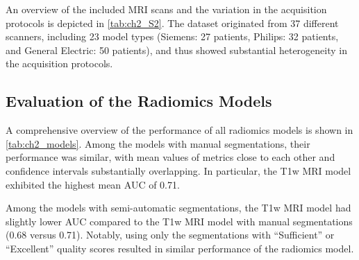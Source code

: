 An overview of the included MRI scans and the variation in the acquisition protocols is depicted in \autoref{tab:ch2_S2}.
The dataset originated from 37 different scanners, including 23 model types (Siemens: 27 patients, Philips: 32 patients, and General Electric: 50 patients), and thus showed substantial heterogeneity in the acquisition protocols.

\subsection{Evaluation of the Radiomics Models}
A comprehensive overview of the performance of all radiomics models is shown in \autoref{tab:ch2_models}.
Among the models with manual segmentations, their performance was similar, with mean values of metrics close to each other and confidence intervals substantially overlapping.
In particular, the T1w MRI model exhibited the highest mean AUC of 0.71.

Among the models with semi-automatic segmentations, the T1w MRI model had slightly lower AUC compared to the T1w MRI model with manual segmentations (0.68 versus 0.71).
Notably, using only the segmentations with ``Sufficient'' or ``Excellent'' quality scores resulted in similar performance of the radiomics model.

